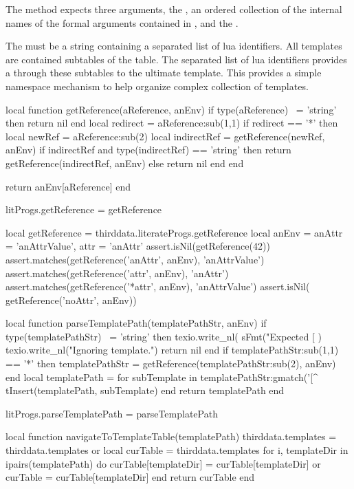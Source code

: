 {{The  method expects three arguments, the 
, an ordered collection of the internal names of the 
formal arguments contained in , and the 
. 

The  must be a string containing a  separated 
list of lua identifiers. All templates are contained subtables of the 
 table. The  separated list of lua 
identifiers provides a  through these subtables to the 
ultimate template. This provides a simple namespace mechanism to help 
organize complex collection of templates. 

\startLuaCode
local function getReference(aReference, anEnv)
  if type(aReference) ~= 'string' then return nil end
  local redirect = aReference:sub(1,1)
  if redirect == '*' then
    local newRef = aReference:sub(2)
    local indirectRef = getReference(newRef, anEnv)
    if indirectRef and type(indirectRef) == 'string' then
      return getReference(indirectRef, anEnv)
    else
      return nil
    end
  end

  return anEnv[aReference]
end

litProgs.getReference = getReference
\stopLuaCode

\startLuaTest
local getReference = thirddata.literateProgs.getReference
local anEnv = { 
  anAttr = 'anAttrValue',
  attr   = 'anAttr'
}
assert.isNil(getReference(42))
assert.matches(getReference('anAttr', anEnv), 'anAttrValue')
assert.matches(getReference('attr',   anEnv), 'anAttr')
assert.matches(getReference('*attr',  anEnv), 'anAttrValue')
assert.isNil(  getReference('noAttr', anEnv))
\stopLuaTest
\stopTestCase

\startLuaCode
local function parseTemplatePath(templatePathStr, anEnv)
  if type(templatePathStr) ~= 'string' then
    texio.write_nl(
      sFmt("Expected [%
    )
    texio.write_nl("Ignoring template.")
    return nil
  end
  if templatePathStr:sub(1,1) == '*' then
    templatePathStr = getReference(templatePathStr:sub(2), anEnv)
  end
  local templatePath = { }
  for subTemplate in templatePathStr:gmatch('[^%
    tInsert(templatePath, subTemplate)
  end
  return templatePath
end

litProgs.parseTemplatePath = parseTemplatePath

local function navigateToTemplateTable(templatePath)
  thirddata.templates = thirddata.templates or { }
  local curTable = thirddata.templates
  for i, templateDir in ipairs(templatePath) do
    curTable[templateDir] = curTable[templateDir] or { }
    curTable = curTable[templateDir]
  end
  return curTable
end

}}
